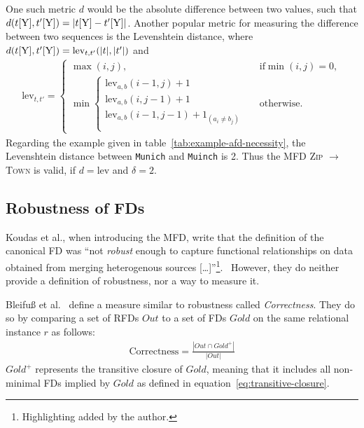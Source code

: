 One such metric \( d \) would be the absolute difference between two values, such that \( d(t[\textsc{Y}], t'[\textsc{Y}]) = | t[\textsc{Y}] - t'[\textsc{Y}]| \).
Another popular metric for measuring the difference between two sequences is the Levenshtein distance, where \( d(t[\textsc{Y}], t'[\textsc{Y}]) = \text{lev}_{t,t'}(|t|, |t'|) \) and
\begin{align*}
    \text{lev}_{t,t'} =
    \begin{cases}
        \max(i,j),  & \text{if} \min(i,j)=0, \\
        \min \begin{cases}
            \text{lev}_{a, b}(i-1, j)+1 & \\
            \text{lev}_{a, b}(i, j-1)+1 & \\
            \text{lev}_{a, b}(i-1, j-1)+1_{(a_i \neq b_j)} \\
        \end{cases} & \text{otherwise.}
    \end{cases}
\end{align*}
Regarding the example given in table~\ref{tab:example-afd-necessity}, the Levenshtein distance between \texttt{Munich} and \texttt{Muinch} is 2.
Thus the MFD \textsc{Zip} \( \to\) \textsc{Town} is valid, if \( d = \text{lev} \) and \( \delta = 2 \).

\subsection{Robustness of FDs}
Koudas et al., when introducing the MFD, write that the definition of the canonical FD was ``not \emph{robust} enough to capture functional relationships on data obtained from merging heterogenous sources [\dots]''\footnote{Highlighting added by the author.}.~\cite[p.~1]{KOU09}
However, they do neither provide a definition of robustness, nor a way to measure it.

Bleifuß et al.~\cite[p.~3]{BLE16} define a measure similar to robustness called \emph{Correctness}.
They do so by comparing a set of RFDs \( Out \) to a set of FDs \( Gold \) on the same relational instance \( r \) as follows:
\begin{align*}
    \text{Correctness} = \frac{|Out \cap Gold^{+}|}{|Out|}
\end{align*}
\( Gold^{+} \) represents the transitive closure of \( Gold \), meaning that it includes all non-minimal FDs implied by \( Gold \) as defined in equation~\ref{eq:transitive-closure}.

